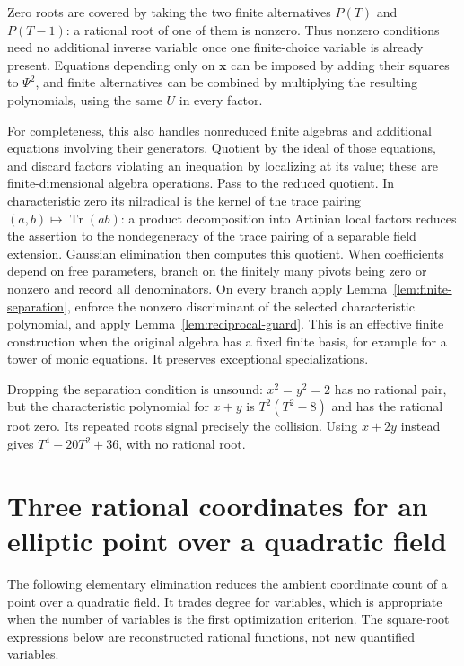 \documentclass[11pt]{article}
\theoremstyle{definition}
\begin{document}
Zero roots are covered by taking the two finite alternatives $P(T)$
and $P(T-1)$: a rational root of one of them is nonzero. Thus nonzero
conditions need no additional inverse variable once one finite-choice
variable is already present. Equations depending only on $\mathbf x$
can be imposed by adding their squares to $\Psi^2$, and finite alternatives
can be combined by multiplying the resulting polynomials, using the
same $U$ in every factor.

For completeness, this also handles nonreduced finite algebras and
additional equations involving their generators. Quotient by the ideal
of those equations, and discard factors violating an inequation by
localizing at its value; these are finite-dimensional algebra operations.
Pass to the reduced quotient. In characteristic zero its nilradical is
the kernel of the trace pairing $(a,b)\mapsto\operatorname{Tr}(ab)$:
a product decomposition into Artinian local factors reduces the assertion
to the nondegeneracy of the trace pairing of a separable field extension.
Gaussian elimination then computes this quotient. When coefficients depend
on free parameters, branch on the finitely many pivots being zero or
nonzero and record all denominators. On every branch apply
Lemma~\ref{lem:finite-separation}, enforce the nonzero discriminant of
the selected characteristic polynomial, and apply
Lemma~\ref{lem:reciprocal-guard}. This is an effective finite construction
when the original algebra has a fixed finite basis, for example for a
tower of monic equations. It preserves exceptional specializations.

Dropping the separation condition is unsound: $x^2=y^2=2$ has no
rational pair, but the characteristic polynomial for $x+y$ is
$T^2(T^2-8)$ and has the rational root zero. Its repeated roots signal
precisely the collision. Using $x+2y$ instead gives
$T^4-20T^2+36$, with no rational root.



\section{Three rational coordinates for an elliptic point over a quadratic field}
\label{sec:quadratic-point-compression}

The following elementary elimination reduces the ambient coordinate count
of a point over a quadratic field.  It trades degree for variables, which
is appropriate when the number of variables is the first optimization
criterion.  The square-root expressions below are reconstructed rational
functions, not new quantified variables.
\end{document}
